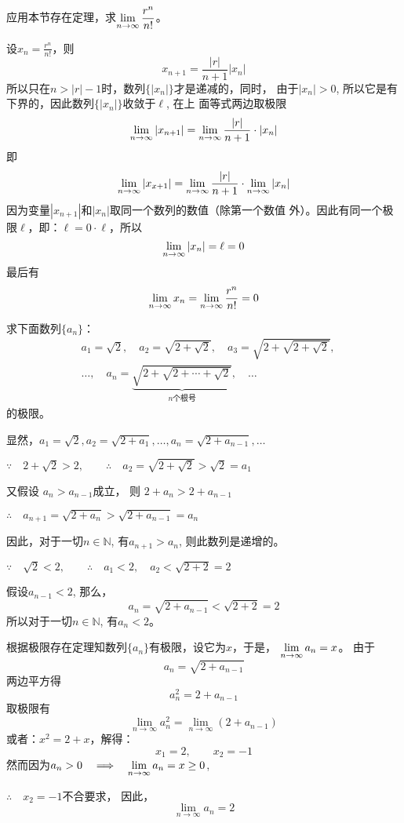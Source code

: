 \begin{example}
    应用本节存在定理，求$\displaystyle\lim_{n\to\infty}\dfrac{r^n}{n!}$。
\end{example}

\begin{solution}
    设$x_n=\frac{r^n}{n!}$，则
\[x_{n+1}=\frac{|r|}{n+1}|x_n|\]
所以只在$n>|r|-1$时，数列$\{|x_n|\}$才是递减的，同时，
由于$|x_n|>0$, 所以它是有下界的，因此数列$\{|x_n|\}$收敛于$\ell$, 在上
面等式两边取极限
\[\displaystyle\lim_{n\to\infty}|x_{n+1}|=\displaystyle\lim_{n\to\infty}\dfrac{|r|}{n+1}\cdot |x_n|\]
即
\[\displaystyle\lim_{n\to\infty}|x_{x+1}|=\displaystyle\lim_{n\to\infty}\dfrac{|r|}{n+1}\cdot \displaystyle\lim_{n\to\infty}|x_n|\]
因为变量$|x_{n+1}|$和$|x_n|$取同一个数列的数值（除第一个数值
外）。因此有同一个极限$\ell$，即：$\ell=0\cdot \ell$，所以
\[\displaystyle\lim_{n\to\infty}|x_n|=\ell=0\]
最后有
\[\displaystyle\lim_{n\to\infty} x_n=\displaystyle\lim_{n\to\infty} \dfrac{r^n}{n!} =0\]
\end{solution}

\begin{example}
    求下面数列$\{a_n\}$：
\[\begin{split}
   &  a_1=\sqrt{2},\quad a_2=\sqrt{2+\sqrt{2}},\quad a_3=\sqrt{2+\sqrt{2+\sqrt{2}}},\\
    & \ldots,\quad a_n=\underbrace{\sqrt{2+\sqrt{2+\cdots+\sqrt{2}}}}_{\text{$n$个根号}},\quad\ldots
\end{split} \]
的极限。
\end{example}
   
\begin{solution}
显然，$a_1=\sqrt{2}, a_2=\sqrt{2+a_1},\ldots,
a_n=\sqrt{2+a_{n-1}},\ldots$

$\because\quad 2+\sqrt{2}>2,\qquad \therefore\quad a_2=\sqrt{2+\sqrt{2}}>\sqrt{2}=a_1$

又假设
$a_n>a_{n-1}$成立，
则
$2+a_n>2+a_{n-1}$

$\therefore\quad a_{n+1}=\sqrt{2+a_n}>\sqrt{2+a_{n-1}}=a_n$

因此，对于一切$n\in\mathbb{N}$, 有$a_{n+1}>a_n$, 则此数列是递增的。

$\because\quad \sqrt{2}<2,\qquad \therefore\quad a_1<2,\quad a_2<\sqrt{2+2}=2$

假设$a_{n-1}<2$, 那么，
\[a_n=\sqrt{2+a_{n-1}}<\sqrt{2+2}=2\]
所以对于一切$n\in\mathbb{N}$, 有$a_n<2$。

根据极限存在定理知数列$\{a_n\}$有极限，设它为$x$，于是，
$\displaystyle\lim_{n\to\infty}a_n=x$。
由于
\[a_n=\sqrt{2+a_{n-1}}\]
两边平方得
\[a^2_n={2+a_{n-1}}\]
取极限有
\[\lim_{n\to\infty}a^2_n =\lim_{n\to\infty}(2+a_{n-1})\]
或者：$x^2=2+x$，解得：
\[x_1=2,\qquad x_2=-1\]
然而因为$a_n>0\quad \Longrightarrow\quad \displaystyle\lim_{n\to\infty}a_n=x\ge 0$,

$\therefore\quad x_2=-1$不合要求，
因此，
\[\lim_{n\to\infty}a_n=2\]
\end{solution}

